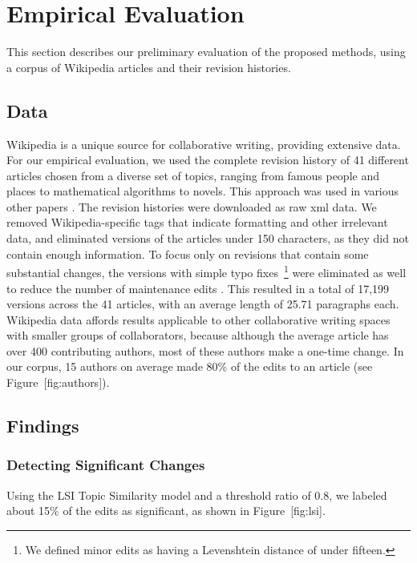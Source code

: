 \section{Empirical Evaluation}\label{empirical-evaluation}

This section describes our preliminary evaluation of the proposed
methods, using a corpus of Wikipedia articles and their revision
histories.

\subsection{Data}\label{data}

Wikipedia is a unique source for collaborative writing, providing
extensive data. For our empirical evaluation, we used the complete
revision history of 41 different articles chosen from a diverse set of
topics, ranging from famous people and places to mathematical algorithms
to novels. This approach was used in various other papers
\cite{wohner2009assessing, fong2010did}. The revision histories were
downloaded as raw xml data. We removed Wikipedia-specific tags that
indicate formatting and other irrelevant data, and eliminated versions
of the articles under 150 characters, as they did not contain enough
information. To focus only on revisions that contain some substantial
changes, the versions with simple typo fixes~\footnote{We defined minor
  edits as having a Levenshtein distance of under fifteen.} were
eliminated as well to reduce the number of maintenance edits
\cite{kittur2007he}. This resulted in a total of 17,199 versions across
the 41 articles, with an average length of 25.71 paragraphs each.
Wikipedia data affords results applicable to other collaborative writing
spaces with smaller groups of collaborators, because although the
average article has over 400 contributing authors, most of these authors
make a one-time change. In our corpus, 15 authors on average made 80\%
of the edits to an article (see Figure~{[}fig:authors{]}).

\subsection{Findings}\label{findings}

\subsubsection{Detecting Significant
Changes}\label{detecting-significant-changes}

Using the LSI Topic Similarity model and a threshold ratio of 0.8, we
labeled about 15\% of the edits as significant, as shown in
Figure~{[}fig:lsi{]}.

